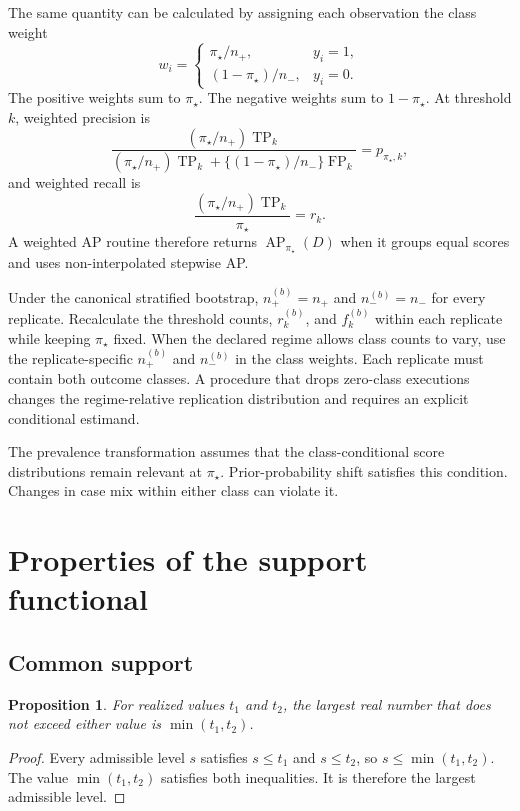 \documentclass[11pt]{article}
\newcommand{\AP}{\operatorname{AP}}
\newtheorem{proposition}{Proposition}
\theoremstyle{remark}
\begin{document}
The same quantity can be calculated by assigning each observation the class weight
\begin{equation}
w_i
=
\begin{cases}
\pi_\star/n_+, & y_i=1,\\[4pt]
(1-\pi_\star)/n_-, & y_i=0.
\end{cases}
\label{eq:reference-weights}
\end{equation}
The positive weights sum to $\pi_\star$. The negative weights sum to $1-\pi_\star$. At threshold $k$, weighted precision is
\[
\frac{(\pi_\star/n_+)\operatorname{TP}_k}
{(\pi_\star/n_+)\operatorname{TP}_k
+
\{(1-\pi_\star)/n_-\}\operatorname{FP}_k}
=
p_{\pi_\star,k},
\]
and weighted recall is
\[
\frac{(\pi_\star/n_+)\operatorname{TP}_k}{\pi_\star}
=
r_k.
\]
A weighted AP routine therefore returns $\AP_{\pi_\star}(D)$ when it groups equal scores and uses non-interpolated stepwise AP.

Under the canonical stratified bootstrap, $n_+^{(b)}=n_+$ and $n_-^{(b)}=n_-$ for every replicate. Recalculate the threshold counts, $r_k^{(b)}$, and $f_k^{(b)}$ within each replicate while keeping $\pi_\star$ fixed. When the declared regime allows class counts to vary, use the replicate-specific $n_+^{(b)}$ and $n_-^{(b)}$ in the class weights. Each replicate must contain both outcome classes. A procedure that drops zero-class executions changes the regime-relative replication distribution and requires an explicit conditional estimand.

The prevalence transformation assumes that the class-conditional score distributions remain relevant at $\pi_\star$. Prior-probability shift satisfies this condition. Changes in case mix within either class can violate it.

\section{Properties of the support functional}
\label{app:properties}

\subsection{Common support}

\begin{proposition}
For realized values $t_1$ and $t_2$, the largest real number that does not exceed either value is $\min(t_1,t_2)$.
\end{proposition}

\begin{proof}
Every admissible level $s$ satisfies $s\leq t_1$ and $s\leq t_2$, so $s\leq\min(t_1,t_2)$. The value $\min(t_1,t_2)$ satisfies both inequalities. It is therefore the largest admissible level.
\end{proof}
\end{document}
